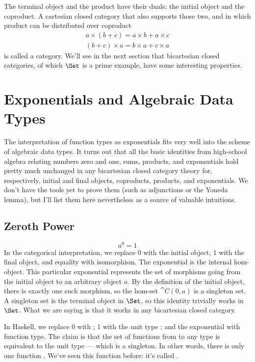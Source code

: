 The terminal object and the product have their duals: the initial object
and the coproduct. A cartesian closed category that also supports those
two, and in which product can be distributed over coproduct
\begin{gather*}
a \times (b + c) = a \times b + a \times c \\
(b + c) \times a = b \times a + c \times a
\end{gather*}
is called a  category. We'll see in the next
section that bicartesian closed categories, of which $\Set$ is a
prime example, have some interesting properties.

\section{Exponentials and Algebraic Data Types}

The interpretation of function types as exponentials fits very well into
the scheme of algebraic data types. It turns out that all the basic
identities from high-school algebra relating numbers zero and one, sums,
products, and exponentials hold pretty much unchanged in any bicartesian
closed category theory for, respectively, initial and final objects,
coproducts, products, and exponentials. We don't have the tools yet to
prove them (such as adjunctions or the Yoneda lemma), but I'll list them
here nevertheless as a source of valuable intuitions.

\subsection{Zeroth Power}

\[a^{0} = 1\]
In the categorical interpretation, we replace 0 with the initial object,
1 with the final object, and equality with isomorphism. The exponential
is the internal hom-object. This particular exponential represents the
set of morphisms going from the initial object to an arbitrary object
$a$. By the definition of the initial object, there is exactly
one such morphism, so the hom-set $\cat{C}(0, a)$ is a singleton set. A
singleton set is the terminal object in $\Set$, so this identity
trivially works in $\Set$. What we are saying is that it works in
any bicartesian closed category.

In Haskell, we replace 0 with ; 1 with the unit type
\code{()}; and the exponential with function type. The claim is that
the set of functions from  to any type  is
equivalent to the unit type --- which is a singleton. In other words,
there is only one function . We've seen
this function before: it's called .

